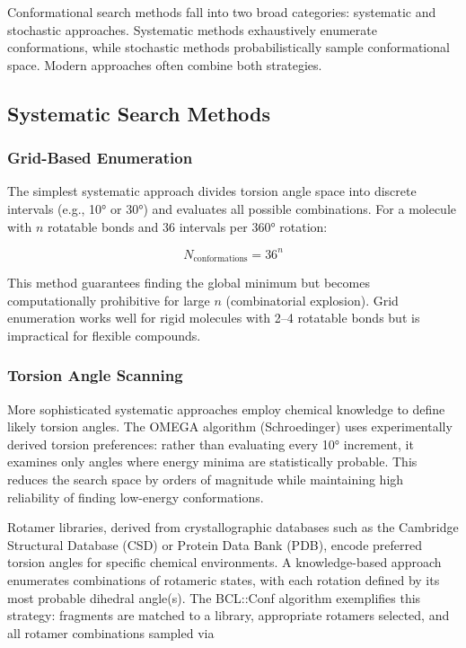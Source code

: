 \documentclass[12pt]{article}
\begin{document}
Conformational search methods fall into two broad categories: systematic and stochastic approaches. Systematic methods exhaustively enumerate conformations, while stochastic methods probabilistically sample conformational space. Modern approaches often combine both strategies.

\subsection{Systematic Search Methods}

\subsubsection{Grid-Based Enumeration}

The simplest systematic approach divides torsion angle space into discrete intervals (e.g., 10° or 30°) and evaluates all possible combinations. For a molecule with $n$ rotatable bonds and 36 intervals per 360° rotation:

\begin{equation}
N_{\text{conformations}} = 36^n
\label{eq:grid_enumeration}
\end{equation}

This method guarantees finding the global minimum but becomes computationally prohibitive for large $n$ (combinatorial explosion). Grid enumeration works well for rigid molecules with 2--4 rotatable bonds but is impractical for flexible compounds.

\subsubsection{Torsion Angle Scanning}

More sophisticated systematic approaches employ chemical knowledge to define likely torsion angles. The OMEGA algorithm (Schroedinger) uses experimentally derived torsion preferences: rather than evaluating every 10° increment, it examines only angles where energy minima are statistically probable. This reduces the search space by orders of magnitude while maintaining high reliability of finding low-energy conformations.

Rotamer libraries, derived from crystallographic databases such as the Cambridge Structural Database (CSD) or Protein Data Bank (PDB), encode preferred torsion angles for specific chemical environments. A knowledge-based approach enumerates combinations of rotameric states, with each rotation defined by its most probable dihedral angle(s). The BCL::Conf algorithm exemplifies this strategy: fragments are matched to a library, appropriate rotamers selected, and all rotamer combinations sampled via
\end{document}
